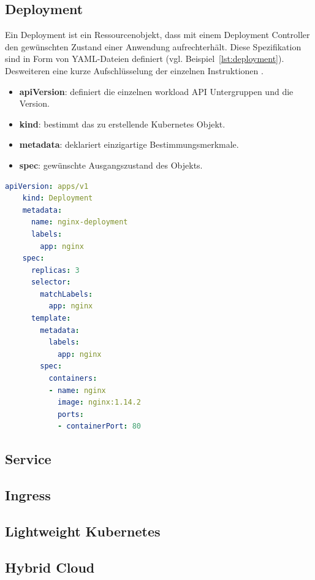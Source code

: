 \subsection{Deployment}
Ein Deployment ist ein Ressourcenobjekt, dass mit einem Deployment Controller den gewünschten Zustand einer Anwendung aufrechterhält.
Diese Spezifikation sind in Form von YAML-Dateien definiert (vgl. Beispiel~\ref{lst:deployment}).
Desweiteren eine kurze Aufschlüsselung der einzelnen Instruktionen \cite{kubernetesobjects}.
\begin{itemize}
    \item \textbf{apiVersion}: definiert die einzelnen workload API Untergruppen und die Version.
    \item \textbf{kind}: bestimmt das zu erstellende Kubernetes Objekt.
    \item \textbf{metadata}: deklariert einzigartige Bestimmungsmerkmale.
    \item \textbf{spec}: gewünschte Ausgangszustand des Objekts.
\end{itemize}

\begin{lstlisting}[caption={Deployment.yaml \cite{kubernetesdeployment} },captionpos=b,label={lst:deployment},language=yaml]
    apiVersion: apps/v1
    kind: Deployment
    metadata:
      name: nginx-deployment
      labels:
        app: nginx
    spec:
      replicas: 3
      selector:
        matchLabels:
          app: nginx
      template:
        metadata:
          labels:
            app: nginx
        spec:
          containers:
          - name: nginx
            image: nginx:1.14.2
            ports:
            - containerPort: 80
    \end{lstlisting}

\subsection{Service}
\subsection{Ingress}

\subsection{Lightweight Kubernetes}
\subsection{Hybrid Cloud}
